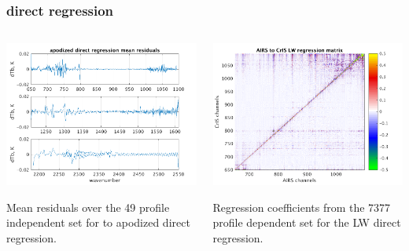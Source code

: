 \documentclass[10pt]{beamer}
\begin{document}
\begin{frame}
\frametitle{direct regression}
\begin{columns}[t]
\begin{column}{0.5\textwidth}
  \begin{centering}
  \includegraphics[width=\textwidth]{slackfigs/ap_direct_regr.png}
  \end{centering}\vspace{3mm}
  Mean residuals over the 49 profile independent set for {\airs} to
  apodized {\cris} direct regression.

\end{column}
\begin{column}{0.5\textwidth}  
  \begin{centering}
  \includegraphics[width=\textwidth]{slackfigs/full_7377_LW_regr_mat.png}
  \end{centering}\vspace{3mm}
  Regression coefficients from the 7377 profile dependent set for
  the LW direct regression.

\end{column}
\end{columns}
\end{frame}
\end{document}
